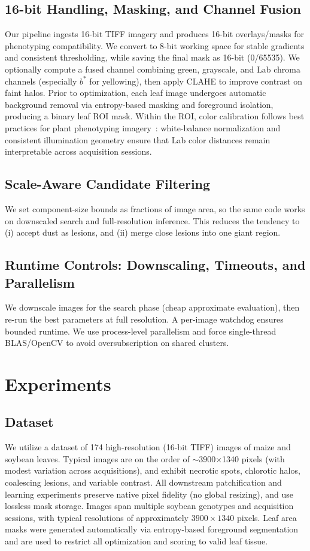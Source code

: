 \documentclass[11pt,a4paper]{article}
\begin{document}
\subsection{16-bit Handling, Masking, and Channel Fusion}
Our pipeline ingests 16-bit TIFF imagery and produces 16-bit overlays/masks for phenotyping compatibility.
We convert to 8-bit working space for stable gradients and consistent thresholding, while saving the final mask as 16-bit (0/65535).
We optionally compute a fused channel combining green, grayscale, and Lab chroma channels (especially $b^\ast$ for yellowing), then apply CLAHE to improve contrast on faint halos.
Prior to optimization, each leaf image undergoes automatic background removal via entropy-based masking and foreground isolation, producing a binary leaf ROI mask. Within the ROI, color calibration follows best practices for plant phenotyping imagery~\citep{berry2018color}: white-balance normalization and consistent illumination geometry ensure that Lab color distances remain interpretable across acquisition sessions.

\subsection{Scale-Aware Candidate Filtering}
We set component-size bounds as fractions of image area, so the same code works on downscaled search and full-resolution inference. This reduces the tendency to (i) accept dust as lesions, and (ii) merge close lesions into one giant region.

\subsection{Runtime Controls: Downscaling, Timeouts, and Parallelism}
We downscale images for the search phase (cheap approximate evaluation), then re-run the best parameters at full resolution. A per-image watchdog ensures bounded runtime. We use process-level parallelism and force single-thread BLAS/OpenCV to avoid oversubscription on shared clusters.

\section{Experiments}

\subsection{Dataset}
We utilize a dataset of 174 high-resolution (16-bit TIFF) images of maize and soybean leaves.
Typical images are on the order of $\sim$3900$\times$1340 pixels (with modest variation across acquisitions), and exhibit necrotic spots, chlorotic halos, coalescing lesions, and variable contrast.
All downstream patchification and learning experiments preserve native pixel fidelity (no global resizing), and use lossless mask storage.
Images span multiple soybean genotypes and acquisition sessions, with typical resolutions of approximately $3900 \times 1340$ pixels. Leaf area masks were generated automatically via entropy-based foreground segmentation and are used to restrict all optimization and scoring to valid leaf tissue.
\end{document}
